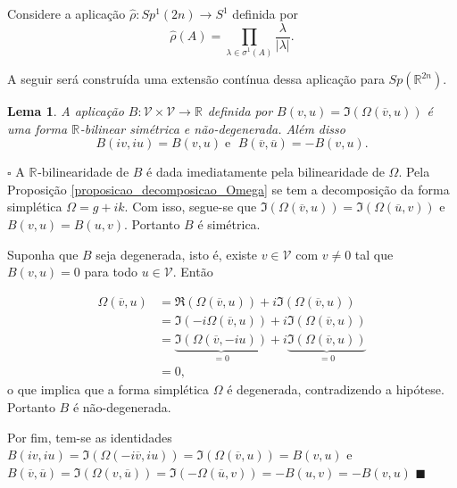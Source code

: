 \documentclass[12pt]{book}
\newtheorem{lema}[teorema]{Lema}
\newenvironment{prova}[1]{$\square$ #1}{\hfill$\blacksquare$}
\newcommand{\autovalorprimeirotipo}[1]{\sigma^{1}(#1)}
\newcommand{\circulo}{S^{1}}
\newcommand{\complexificado}[1]{\mathcal{#1}}
\newcommand{\formaSimpleticaExtendida}[2]{\Omega(#1, #2)}
\newcommand{\gruposimpletico}[1]{Sp(#1)}
\newcommand{\gruposimpleticoespecial}[1]{Sp^{1}(#1)}
\newcommand{\parteImaginaria}[1]{\Im(#1)}
\newcommand{\parteReal}[1]{\Re(#1)}
\newcommand{\real}[1]{\mathbb{R}^{#1}}
\newcommand{\reta}{\real{}}
\begin{document}
	Considere a aplicação $\hat{\rho}:\gruposimpleticoespecial{2n} \to \circulo$ definida por 
	$$
		\hat{\rho}(A) = \prod_{\lambda\in \autovalorprimeirotipo{A}}\frac{\lambda}{|\lambda|}.
	$$
	
	A seguir será construída uma extensão contínua dessa aplicação para $\gruposimpletico{\real{2n}}$.
	
	\begin{lema}\label{lema_forma_simetrica_B}
		A aplicação $B:\complexificado{V}\times \complexificado{V} \to \reta$ definida por $B(v, u ) = \parteImaginaria{\formaSimpleticaExtendida{\overline{v}}{u}}$ é uma forma $\reta$-bilinear simétrica e não-degenerada. Além disso
		$$
		B(iv,iu) = B(v,u)\;\text{e }\;B(\overline{v},\overline{u})=-B(v,u).
		$$
	\end{lema}
	\begin{prova} 
		A $\reta$-bilinearidade de $B$ é dada imediatamente pela bilinearidade de $\Omega$. Pela Proposição \ref{proposicao_decomposicao_Omega} se tem a decomposição da forma simplética $\Omega=g+ik$. Com isso, segue-se que  $\parteImaginaria{\formaSimpleticaExtendida{\overline{v}}{u} } = \parteImaginaria{\formaSimpleticaExtendida{\overline{u}}{v} }$ e $B(v,u) = B(u,v)$. Portanto $B$ é simétrica.
		
		Suponha que $B$ seja degenerada, isto é, existe $v \in \complexificado{V}$ com $v\neq 0$ tal que $B(v, u ) = 0$ para todo $u \in \complexificado{V}$. Então
		
		$$
		\begin{aligned}
		\formaSimpleticaExtendida{\overline{v}}{u} &=\parteReal{\formaSimpleticaExtendida{\overline{v}}{u}} +i \parteImaginaria{\formaSimpleticaExtendida{\overline{v}}{u}} 
		\\
		&= \parteImaginaria{-i\formaSimpleticaExtendida{\overline{v}}{u}} +i \parteImaginaria{\formaSimpleticaExtendida{\overline{v}}{u}}
		\\
		&= \underbrace{\parteImaginaria{\formaSimpleticaExtendida{\overline{v}}{-iu}}}_{=0} +i \underbrace{\parteImaginaria{\formaSimpleticaExtendida{\overline{v}}{u}}}_{=0}
		\\
		&=0,
		\end{aligned}
		$$
		o que implica que a forma simplética $\Omega$ é degenerada, contradizendo a hipótese. Portanto $B$ é não-degenerada.
		
		Por fim, tem-se as identidades $B(iv,iu) = \parteImaginaria{\formaSimpleticaExtendida{-i\overline{v}}{iu}}= \parteImaginaria{\formaSimpleticaExtendida{\overline{v}}{u}}=B(v,u)$ e $B(\overline{v},\overline{u})  = \parteImaginaria{\formaSimpleticaExtendida{v}{\overline{u}}} = \parteImaginaria{-\formaSimpleticaExtendida{\overline{u}}{v}} = -B(u,v) = -B(v,u)$
	\end{prova}
	
\end{document}

